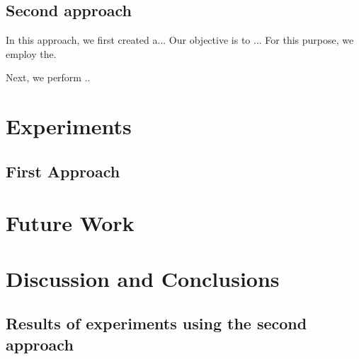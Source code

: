 \documentclass[]{IEEEtran}
\begin{document}
\subsection{Second approach}
\label{sec:second_approach}

In this approach, we first created a...
Our objective is to ...  For this purpose, we employ the.

Next, we perform ..

\section{Experiments}

\subsection{First Approach}

\section{Future Work}

\section{Discussion and Conclusions}





\clearpage
\onecolumn
\begin{appendices}

\section{Results of experiments using the second approach}
\label{sec:appendix}

\end{appendices}
\end{document}
